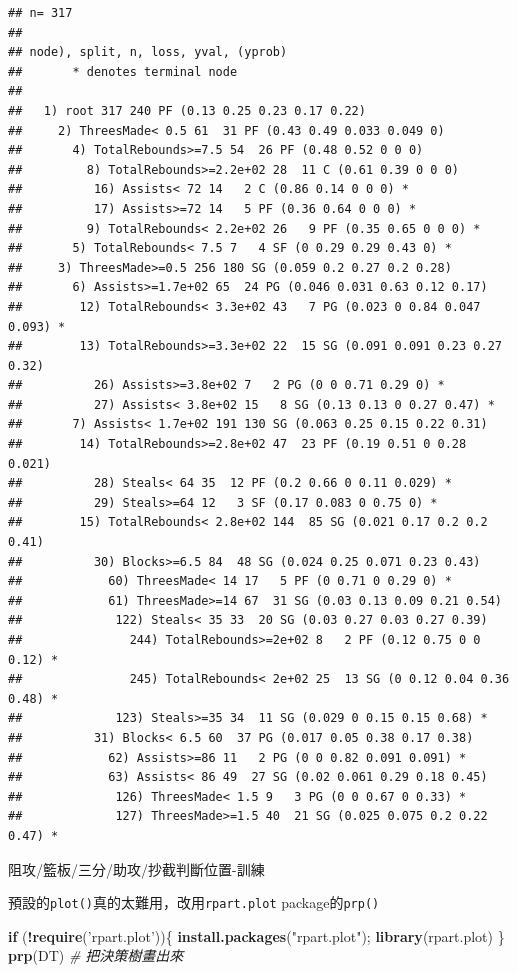 \documentclass[]{book}
\newenvironment{Shaded}{\begin{snugshade}}{\end{snugshade}}
\newcommand{\CommentTok}[1]{\textcolor[rgb]{0.56,0.35,0.01}{\textit{#1}}}
\newcommand{\ControlFlowTok}[1]{\textcolor[rgb]{0.13,0.29,0.53}{\textbf{#1}}}
\newcommand{\KeywordTok}[1]{\textcolor[rgb]{0.13,0.29,0.53}{\textbf{#1}}}
\newcommand{\NormalTok}[1]{#1}
\newcommand{\OperatorTok}[1]{\textcolor[rgb]{0.81,0.36,0.00}{\textbf{#1}}}
\newcommand{\StringTok}[1]{\textcolor[rgb]{0.31,0.60,0.02}{#1}}
\begin{document}
\begin{verbatim}
## n= 317 
## 
## node), split, n, loss, yval, (yprob)
##       * denotes terminal node
## 
##   1) root 317 240 PF (0.13 0.25 0.23 0.17 0.22)  
##     2) ThreesMade< 0.5 61  31 PF (0.43 0.49 0.033 0.049 0)  
##       4) TotalRebounds>=7.5 54  26 PF (0.48 0.52 0 0 0)  
##         8) TotalRebounds>=2.2e+02 28  11 C (0.61 0.39 0 0 0)  
##          16) Assists< 72 14   2 C (0.86 0.14 0 0 0) *
##          17) Assists>=72 14   5 PF (0.36 0.64 0 0 0) *
##         9) TotalRebounds< 2.2e+02 26   9 PF (0.35 0.65 0 0 0) *
##       5) TotalRebounds< 7.5 7   4 SF (0 0.29 0.29 0.43 0) *
##     3) ThreesMade>=0.5 256 180 SG (0.059 0.2 0.27 0.2 0.28)  
##       6) Assists>=1.7e+02 65  24 PG (0.046 0.031 0.63 0.12 0.17)  
##        12) TotalRebounds< 3.3e+02 43   7 PG (0.023 0 0.84 0.047 0.093) *
##        13) TotalRebounds>=3.3e+02 22  15 SG (0.091 0.091 0.23 0.27 0.32)  
##          26) Assists>=3.8e+02 7   2 PG (0 0 0.71 0.29 0) *
##          27) Assists< 3.8e+02 15   8 SG (0.13 0.13 0 0.27 0.47) *
##       7) Assists< 1.7e+02 191 130 SG (0.063 0.25 0.15 0.22 0.31)  
##        14) TotalRebounds>=2.8e+02 47  23 PF (0.19 0.51 0 0.28 0.021)  
##          28) Steals< 64 35  12 PF (0.2 0.66 0 0.11 0.029) *
##          29) Steals>=64 12   3 SF (0.17 0.083 0 0.75 0) *
##        15) TotalRebounds< 2.8e+02 144  85 SG (0.021 0.17 0.2 0.2 0.41)  
##          30) Blocks>=6.5 84  48 SG (0.024 0.25 0.071 0.23 0.43)  
##            60) ThreesMade< 14 17   5 PF (0 0.71 0 0.29 0) *
##            61) ThreesMade>=14 67  31 SG (0.03 0.13 0.09 0.21 0.54)  
##             122) Steals< 35 33  20 SG (0.03 0.27 0.03 0.27 0.39)  
##               244) TotalRebounds>=2e+02 8   2 PF (0.12 0.75 0 0 0.12) *
##               245) TotalRebounds< 2e+02 25  13 SG (0 0.12 0.04 0.36 0.48) *
##             123) Steals>=35 34  11 SG (0.029 0 0.15 0.15 0.68) *
##          31) Blocks< 6.5 60  37 PG (0.017 0.05 0.38 0.17 0.38)  
##            62) Assists>=86 11   2 PG (0 0 0.82 0.091 0.091) *
##            63) Assists< 86 49  27 SG (0.02 0.061 0.29 0.18 0.45)  
##             126) ThreesMade< 1.5 9   3 PG (0 0 0.67 0 0.33) *
##             127) ThreesMade>=1.5 40  21 SG (0.025 0.075 0.2 0.22 0.47) *
\end{verbatim}

阻攻/籃板/三分/助攻/抄截判斷位置-訓練

預設的\texttt{plot()}真的太難用，改用\texttt{rpart.plot} package的\texttt{prp()}

\begin{Shaded}
\begin{Highlighting}[]
\ControlFlowTok{if}\NormalTok{ (}\OperatorTok{!}\KeywordTok{require}\NormalTok{(}\StringTok{'rpart.plot'}\NormalTok{))\{}
  \KeywordTok{install.packages}\NormalTok{(}\StringTok{"rpart.plot"}\NormalTok{); }
  \KeywordTok{library}\NormalTok{(rpart.plot)}
\NormalTok{\}}
\KeywordTok{prp}\NormalTok{(DT) }\CommentTok{# 把決策樹畫出來}
\end{Highlighting}
\end{Shaded}
\end{document}

